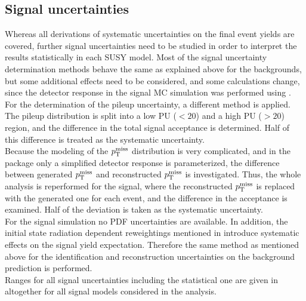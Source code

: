 \subsection{Signal uncertainties}
Whereas all derivations of systematic uncertainties on the final event yields are covered, further signal uncertainties need to be studied in order to interpret the results statistically in each SUSY model.
Most of the signal uncertainty determination methods behave the same as explained above for the backgrounds, but some additional effects need to be considered, and some calculations change, since the detector response in the signal MC simulation was performed using \FASTSIM.\\
For the determination of the pileup uncertainty, a different method is applied. The pileup distribution is split into a low PU ($<20$) and a high PU ($>20$) region, and the difference in the total signal acceptance is determined. Half of this difference is treated as the systematic uncertainty.\\
Because the modeling of the $p_{\mathrm{T}}^\text{miss}$ distribution is very complicated, and in the \FASTSIM package only a simplified detector response is parameterized, the difference between generated $p_{\mathrm{T}}^\text{miss}$ and reconstructed $p_{\mathrm{T}}^\text{miss}$ is investigated. Thus, the whole analysis is reperformed for the signal, where the reconstructed $p_{\mathrm{T}}^\text{miss}$ is replaced with the generated one for each event, and the difference in the acceptance is examined. Half of the deviation is taken as the systematic uncertainty.\\
For the signal simulation no PDF uncertainties are available. In addition, the initial state radiation dependent reweightings mentioned in  introduce systematic effects on the signal yield expectation. Therefore the same method as mentioned above for the identification and reconstruction uncertainties on the background prediction is performed.\\
Ranges for all signal uncertainties including the statistical one are given in  altogether for all signal models considered in the analysis.
